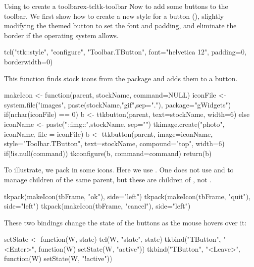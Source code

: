 \begin{example}{Using  to create a toolbar}{ex-tcltk-toolbar}
Now to add some buttons to the toolbar. We first show how to create a
new style for a button (), slightly modifying the themed button to set
the font and padding, and eliminate the border if the operating system allows. 
\begin{Schunk}
\begin{Sinput}
 tcl("ttk::style", "configure", "Toolbar.TButton", 
     font="helvetica 12", padding=0, borderwidth=0)
\end{Sinput}
\end{Schunk}
%
This  function finds stock icons from the
 package and adds them to a button.
\begin{Schunk}
\begin{Sinput}
 makeIcon <- function(parent, stockName, command=NULL) {
   iconFile <- system.file("images", 
                           paste(stockName,"gif",sep="."), 
                           package="gWidgets")
   if(nchar(iconFile) == 0) {
     b <- ttkbutton(parent, text=stockName, width=6)
   } else {
     iconName <- paste("::img::",stockName, sep="")
     tkimage.create("photo", iconName, file = iconFile)
     b <- ttkbutton(parent, image=iconName, 
                    style="Toolbar.TButton", text=stockName, 
                    compound="top", width=6)
     if(!is.null(command))
       tkconfigure(b, command=command)
   }
   return(b)
 }
\end{Sinput}
\end{Schunk}
%
To illustrate, we pack in some icons. Here we use .  
One does not use  and  to manage
children of the same parent, but these are children of ,
not .
\begin{Schunk}
\begin{Sinput}
 tkpack(makeIcon(tbFrame, "ok"), side="left")
 tkpack(makeIcon(tbFrame, "quit"), side="left")
 tkpack(makeIcon(tbFrame, "cancel"), side="left")
\end{Sinput}
\end{Schunk}

These two bindings change the state of the buttons as the mouse hovers
over it:

\begin{Schunk}
\begin{Sinput}
 setState <- function(W, state) tcl(W, "state", state)
 tkbind("TButton", "<Enter>", function(W) setState(W, "active"))
 tkbind("TButton", "<Leave>", function(W) setState(W, "!active"))
\end{Sinput}
\end{Schunk}


\end{example}
